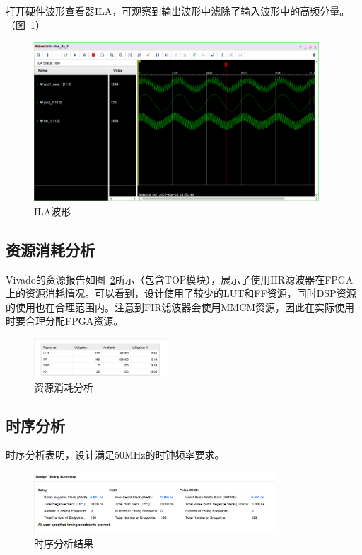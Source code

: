 打开硬件波形查看器ILA，可观察到输出波形中滤除了输入波形中的高频分量。（图~\ref{fig:exp8:sim:ILA}）
\begin{figure}[htbp]
  \centering
  \includegraphics[width = 0.95\textwidth]{figure/exp8/ILA.png}
  \caption{ILA波形}
  \label{fig:exp8:sim:ILA}
\end{figure}

\subsection{资源消耗分析}
Vivado的资源报告如图~\ref{fig:exp8:resource_analysis}所示（包含TOP模块），展示了使用IIR滤波器在FPGA上的资源消耗情况。可以看到，设计使用了较少的LUT和FF资源，同时DSP资源的使用也在合理范围内。注意到FIR滤波器会使用MMCM资源，因此在实际使用时要合理分配FPGA资源。

\begin{figure}[htbp]
    \centering
    \includegraphics[width=0.45\textwidth]{figure/exp8/util_summary.png}
    \caption{资源消耗分析}
    \label{fig:exp8:resource_analysis}
\end{figure}
\subsection{时序分析}

时序分析表明，设计满足50MHz的时钟频率要求。
\begin{figure}[htbp]
    \centering
    \includegraphics[width=0.8\textwidth]{figure/exp8/timing_summary.png}
    \caption{时序分析结果}
    \label{fig:exp8:time_analysis}
\end{figure}

